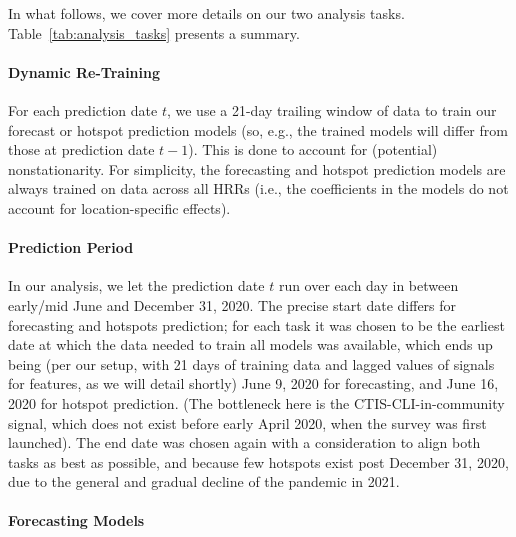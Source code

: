 \documentclass[9pt,twocolumn,twoside,lineno]{pnas-new}
\begin{document}
In what follows, we cover more details on our two analysis
tasks. Table~\ref{tab:analysis_tasks} presents a summary.   

\paragraph{Dynamic Re-Training}

For each prediction date $t$, we use a 21-day trailing window of data to train
our forecast or hotspot prediction models (so, e.g., the trained models will
differ from those at prediction date $t-1$).  This is done to account for
(potential) nonstationarity.  For simplicity, the forecasting and hotspot
prediction models are always trained on data across all HRRs (i.e., the
coefficients in the models do not account for location-specific effects).   

\paragraph{Prediction Period}

In our analysis, we let the prediction date $t$ run over each day in between
early/mid June and December 31, 2020.  The precise start date differs for 
forecasting and hotspots prediction; for each task it was chosen to be the
earliest date at which the data needed to train all models was available, which
ends up being (per our setup, with 21 days of training data and lagged values 
of signals for features, as we will detail shortly) June 9, 2020 for
forecasting, and June 16, 2020 for hotspot prediction. (The bottleneck here is
the CTIS-CLI-in-community signal, which does not exist before early April 2020,
when the survey was first launched). The end date was chosen again with a 
consideration to align both tasks as best as possible, and because few hotspots
exist post December 31, 2020, due to the general and gradual decline of the
pandemic in 2021.

\paragraph{Forecasting Models}
\end{document}
